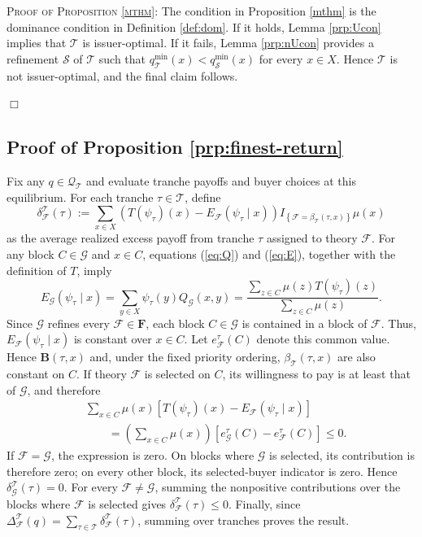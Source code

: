 \documentclass[11pt]{article}
\theoremstyle{plain}
\begin{document}
\textsc{Proof of Proposition \ref{mthm}}: The condition in Proposition \ref{mthm} is the dominance condition in Definition \ref{def:dom}. If it holds, Lemma \ref{prp:Ucon} implies that $\mathcal{T}$ is issuer-optimal. If it fails, Lemma \ref{prp:nUcon} provides a refinement $\mathcal{S}$ of $\mathcal{T}$ such that $q_{\mathcal{T}}^{\min}(x)<q_{\mathcal{S}}^{\min}(x)$ for every $x\in X$. Hence $\mathcal{T}$ is not issuer-optimal, and the final claim follows.

\hfill $\Box$

\subsection{Proof of Proposition \ref{prp:finest-return}}\label{app:finest-return-proof}

Fix any $q\in\mathcal{Q}_{\mathcal{T}}$ and evaluate tranche payoffs and buyer choices at this equilibrium. For each tranche $\tau\in\mathcal{T}$, define
\begin{equation*}
\delta_\mathcal{F}^{\mathcal{T}}(\tau) :=
\sum_{x\in X}
\left(
T(\psi_\tau)(x)-
E_\mathcal{F}(\psi_\tau\mid x)\right)
I_{\left\{\mathcal{F}=\beta_{\mathcal{T}}(\tau,x)\right\}}
\mu(x)
\end{equation*}
as the average realized excess payoff from tranche $\tau$ assigned to theory $\mathcal{F}$. For any block $C\in\mathcal{G}$ and $x\in C$, equations (\ref{eq:Q}) and (\ref{eq:E}), together with the definition of $T$, imply
\[
E_\mathcal{G}(\psi_\tau\mid x)
=
\sum_{y\in X}\psi_\tau(y)Q_\mathcal{G}(x,y)
=
\frac{\sum_{z\in C}\mu(z)T(\psi_\tau)(z)}{\sum_{z\in C}\mu(z)}.
\]
Since $\mathcal{G}$ refines every $\mathcal{F}\in\mathbf{F}$, each block $C\in\mathcal{G}$ is contained in a block of $\mathcal{F}$. Thus, $E_\mathcal{F}(\psi_\tau\mid x)$ is constant over $x\in C$. Let $e_\mathcal{F}^\tau(C)$ denote this common value. Hence $\mathbf{B}(\tau,x)$ and, under the fixed priority ordering, $\beta_\mathcal{T}(\tau,x)$ are also constant on $C$. If theory $\mathcal{F}$ is selected on $C$, its willingness to pay is at least that of $\mathcal{G}$, and therefore
\begin{align*}
&\sum_{x\in C}\mu(x)
\left[T(\psi_\tau)(x)-E_\mathcal{F}(\psi_\tau\mid x)\right]\\
&\qquad=
\left(\sum_{x\in C}\mu(x)\right)
\left[e_\mathcal{G}^\tau(C)-e_\mathcal{F}^\tau(C)\right]
\leq0.
\end{align*}
If $\mathcal{F}=\mathcal{G}$, the expression is zero. On blocks where $\mathcal{G}$ is selected, its contribution is therefore zero; on every other block, its selected-buyer indicator is zero. Hence $\delta_\mathcal{G}^{\mathcal{T}}(\tau)=0$. For every $\mathcal{F}\neq\mathcal{G}$, summing the nonpositive contributions over the blocks where $\mathcal{F}$ is selected gives $\delta_\mathcal{F}^{\mathcal{T}}(\tau)\leq0$. Finally, since $\Delta_\mathcal{F}^{\mathcal{T}}(q)=\sum_{\tau\in\mathcal{T}}\delta_\mathcal{F}^{\mathcal{T}}(\tau)$, summing over tranches proves the result.
\end{document}
